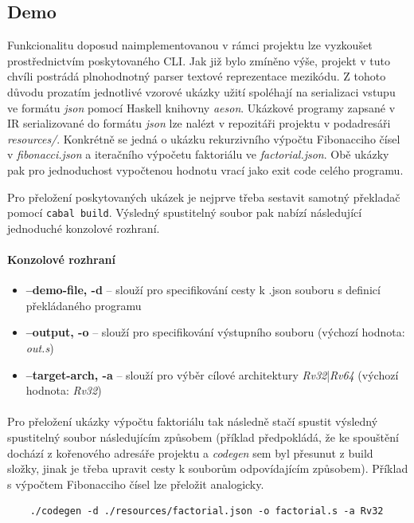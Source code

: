 \documentclass{article}
\begin{document}
\subsection{Demo}

Funkcionalitu doposud naimplementovanou v rámci projektu lze vyzkoušet prostřednictvím poskytovaného CLI. Jak již bylo zmíněno výše, projekt v tuto chvíli postrádá plnohodnotný parser textové reprezentace mezikódu. Z tohoto důvodu prozatím jednotlivé vzorové ukázky užití spoléhají na serializaci vstupu ve formátu \textit{json} pomocí Haskell knihovny \textit{aeson}. Ukázkové programy zapsané v IR serializované do formátu \textit{json} lze nalézt v repozitáři projektu v podadresáři \textit{resources/}. Konkrétně se jedná o ukázku rekurzivního výpočtu Fibonacciho čísel v \textit{fibonacci.json} a iteračního výpočetu faktoriálu ve \textit{factorial.json}. Obě ukázky pak pro jednoduchost vypočtenou hodnotu vrací jako exit code celého programu.

Pro přeložení poskytovaných ukázek je nejprve třeba sestavit samotný překladač pomocí \texttt{cabal build}. Výsledný spustitelný soubor pak nabízí následující jednoduché konzolové rozhraní.
\paragraph{Konzolové rozhraní}
{\renewcommand\labelitemi{}
\begin{itemize}
    \item \textbf{--demo-file, -d}  -- slouží pro specifikování cesty k .json souboru s definicí překládaného programu
    \item \textbf{--output, -o} --  slouží pro specifikování výstupního souboru (výchozí hodnota: \textit{out.s})
    \item \textbf{--target-arch, -a} -- slouží pro výběr cílové architektury \textit{Rv32}|\textit{Rv64} (výchozí hodnota: \textit{Rv32})
\end{itemize}}
\paragraph{}

Pro přeložení ukázky výpočtu faktoriálu tak následně stačí spustit výsledný spustitelný soubor následujícím způsobem (příklad předpokládá, že ke spouštění dochází z kořenového adresáře projektu a \textit{codegen} sem byl přesunut z build složky, jinak je třeba upravit cesty k souborům odpovídajícím způsobem). Příklad s výpočtem Fibonacciho čísel lze přeložit analogicky.
\begin{verbatim}
    ./codegen -d ./resources/factorial.json -o factorial.s -a Rv32 
\end{verbatim}
\end{document}
